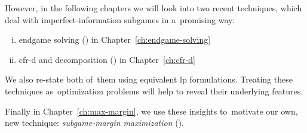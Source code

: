 However, in the following chapters we will look into two recent techniques, which deal with imperfect-information subgames in a~promising way:
\begin{enumerate}[(i)]
  \item endgame solving (\cite{Ganzfried2015endgame}) in Chapter~\ref{ch:endgame-solving}
  \item \acrshort{cfr-d} and decomposition (\cite{BurchJohansonBowling2014}) in Chapter~\ref{ch:cfr-d}
\end{enumerate}
We also re-state both of~them using equivalent \acrshort{lp} formulations.
Treating these techniques as~optimization problems will help to reveal their underlying features.

Finally in Chapter~\ref{ch:max-margin}, we use these insights to~motivate our own, new technique: \emph{subgame-margin maximization} (\cite{Moravcik2016refining}).
